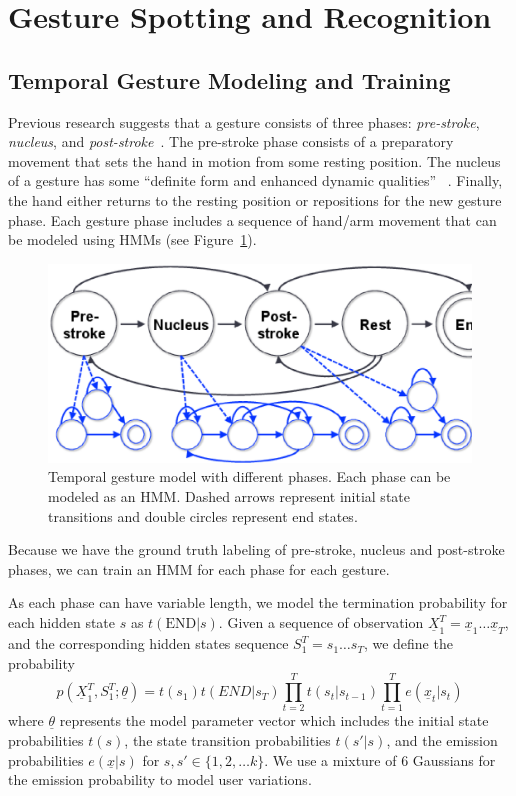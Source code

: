 \documentclass{sig-alternate-2013}
\begin{document}
\section{Gesture Spotting and Recognition}
\subsection{Temporal Gesture Modeling and Training}
Previous research suggests that
a gesture consists of three phases: \textit{pre-stroke}, \textit{nucleus}, and \textit{post-stroke}~\cite{Pavlovic97}. The pre-stroke phase consists
of a preparatory movement that sets the hand in motion from some resting position.
The nucleus of a gesture has some ``definite form and enhanced dynamic qualities''
~\cite{kendon86}. Finally, the hand either returns to the resting position or repositions
for the new gesture phase. Each gesture
phase includes a sequence of hand/arm movement that can be modeled using HMMs (see Figure~\ref{fig:hmm}). 

\begin{figure}[tb]
\centering
\includegraphics[clip, width=1\columnwidth]{fig/hmm.ps}
\caption{Temporal gesture model with different phases. Each phase can be modeled as an HMM. Dashed arrows represent
initial state transitions and double circles
represent end states.}
\label{fig:hmm}
\end{figure}

Because we have the ground truth labeling of pre-stroke, nucleus and post-stroke phases, 
we can train an HMM for each phase for each gesture. 

As each phase can have variable length, we model the termination probability for each
hidden state $s$ as $t(\text{END}|s)$. Given a sequence of observation $\underline{X}_1^T = \underline{x}_1\ldots\underline{x}_T$, and 
the corresponding hidden states sequence $S_1^T = s_1\ldots s_T$, we define the probability
\begin{displaymath}
p(\underline{X}_1^T, S_1^T;\underline{\theta}) = 
    t(s_1)t(END|s_T)\prod_{t = 2}^T t(s_t | s_{t-1})\prod_{t = 1}^T e(\underline{x}_t|s_t)
\end{displaymath}
where $\underline{\theta}$ represents the model parameter vector which includes
the initial state probabilities $t(s)$, the state transition probabilities $t(s'|s)$, and the 
emission probabilities $e(\underline{x}|s)$ for $s, s'\in \{1, 2,\ldots k\}$. 
We use a mixture of 6 Gaussians for the emission probability to model user variations.
\end{document}
